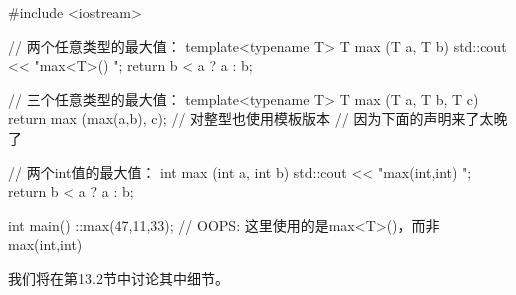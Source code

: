 \begin{cpp}
#include <iostream>

// 两个任意类型的最大值：
template<typename T>
T max (T a, T b) {
	std::cout << "max<T>() \n";
	return b < a ? a : b;
}

// 三个任意类型的最大值：
template<typename T>
T max (T a, T b, T c) {
	return max (max(a,b), c); // 对整型也使用模板版本
}                             // 因为下面的声明来了太晚了
                              
// 两个int值的最大值：
int max (int a, int b) {
	std::cout << "max(int,int) \n";
	return b < a ? a : b;
}

int main() {
	::max(47,11,33); // OOPS: 这里使用的是max<T>()，而非max(int,int)
}
\end{cpp}

我们将在第13.2节中讨论其中细节。


